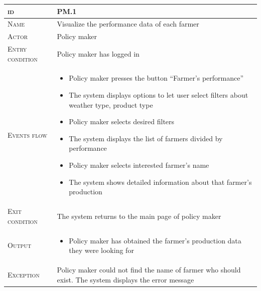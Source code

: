 

\begin{table}[H]
    \centering
    \begin{tabular}{|l|p{}|}
        \hline %
    	\textsc{id}                 &   PM.1\\
    	\hline %
    	\textsc{Name}               &   Visualize the performance data of each farmer\\
    	\hline %
    	\textsc{Actor}             &   Policy maker\\
    	\hline %
    	\textsc{Entry condition}   &   Policy maker has logged in\\
    	\hline %
    	\textsc{Events flow}         &   %
            	                        \begin{itemize}
                                    	    \item Policy maker presses the button “Farmer’s performance”
                                    	    \item The system displays options to let user select filters about weather type, product type
                                    		\item Policy maker selects desired filters
                                    		\item The system displays the list of farmers divided by performance
                                    		\item Policy maker selects interested farmer’s name
                                    		\item The system shows detailed information about that farmer’s production
                                        \end{itemize}\\
        \hline %
        \textsc{Exit condition}    &  The system returns to the main page of policy maker\\
    	\hline %
    	\textsc{Output}             &  \begin{itemize}
    	    \item Policy maker has obtained the farmer's production data they were looking for
    	\end{itemize}\\
    	\hline %
    	\textsc{Exception}         &  Policy maker could not find the name of farmer who should exist. The system displays the error message\\
    	\hline %
        

\end{tabular}
\end{table}
